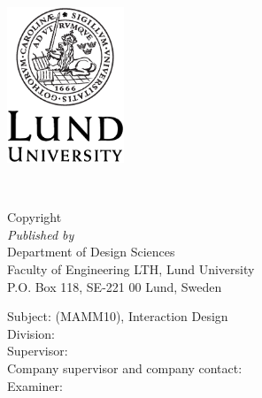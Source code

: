 \documentclass[a4paper,11pt]{article}
\newcommand\HOne{\fontsize{20}{12}\selectfont}
\begin{document}
\renewcommand\titleFirst{Online task-based usability-testing with}
\renewcommand\titleSecond{performance measurements using Python}

\newpage

\renewcommand\titleFirst{Performing online task based usability }
\renewcommand\titleSecond{
  testing and performance measurements \\
  \hspace{0.3cm} \\
  using Python at Massive Entertainment
}

\newpage

%


\newpage

\begin{center}
  {\HOne \titleFull} \\
  \vspace{2.5cm}
  {\Large \name} \\
  \vspace{2.0cm}
  \includegraphics[width=3.5cm]{LU-logotyp-tryck-digitalt/EPS_for_tryck/Engelska/LundUniversity_C2line_BLACK.eps}

\end{center}

\newpage

{\Large \titleFull}
\vspace{1.5cm} \\
\begin{large}
  Copyright \textcopyright \ \the\year \ \name \\

  \textit{Published by} \vspace{0.2cm} \\
      Department of Design Sciences \\
      Faculty of Engineering LTH, Lund University \\
      P.O. Box 118, SE-221 00 Lund, Sweden

  \vspace{0.8cm}
  Subject: (MAMM10), Interaction Design \\
  Division: \division \\
  Supervisor: \supervisor \\
  Company supervisor and company contact: \contact \\
  Examiner: \examiner \\


\end{large}
\end{document}
